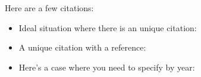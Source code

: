\documentclass{article}
\begin{document}
Here are a few citations:
\begin{itemize}
    \item
        Ideal situation where there is an unique citation:  \cite{stein:iwasawa}
    \item
        A unique citation with a reference: \cite[Prop. 14.2]{mazur:eisenstein}
    \item
        Here's a case where you need to specify by year:
        \cite{mazur:modular:2000}
\end{itemize}
    


\end{document}
